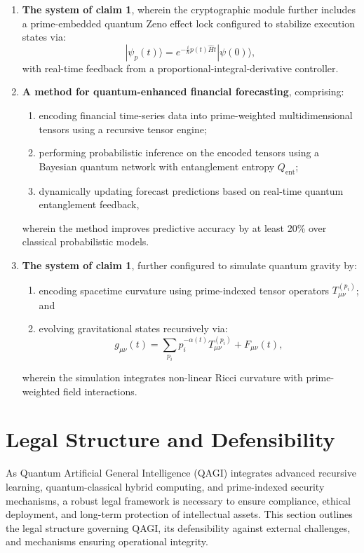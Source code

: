 \documentclass{article}
\theoremstyle{plain}
\theoremstyle{claimstyle}
\begin{document}
\begin{enumerate}
\item \textbf{The system of claim 1}, wherein the cryptographic module further includes a prime-embedded quantum Zeno effect lock configured to stabilize execution states via:
\[
|\psi_p(t)\rangle = e^{-\frac{i}{\hbar} p(t) \hat{H} t} |\psi(0)\rangle,
\]
with real-time feedback from a proportional-integral-derivative controller.

\item \textbf{A method for quantum-enhanced financial forecasting}, comprising:
\begin{enumerate}
    \item encoding financial time-series data into prime-weighted multidimensional tensors using a recursive tensor engine;
    \item performing probabilistic inference on the encoded tensors using a Bayesian quantum network with entanglement entropy \( Q_{\text{ent}} \);
    \item dynamically updating forecast predictions based on real-time quantum entanglement feedback,
\end{enumerate}
wherein the method improves predictive accuracy by at least 20\% over classical probabilistic models.

\item \textbf{The system of claim 1}, further configured to simulate quantum gravity by:
\begin{enumerate}
    \item encoding spacetime curvature using prime-indexed tensor operators \( T_{\mu\nu}^{(p_i)} \); and
    \item evolving gravitational states recursively via:
    \[
    g_{\mu\nu}(t) = \sum_{p_i} p_i^{-\alpha(t)} T_{\mu\nu}^{(p_i)} + F_{\mu\nu}(t),
    \]
\end{enumerate}
wherein the simulation integrates non-linear Ricci curvature with prime-weighted field interactions.

\end{enumerate}

\section{Legal Structure and Defensibility}

As Quantum Artificial General Intelligence (QAGI) integrates advanced recursive learning, quantum-classical hybrid computing, and prime-indexed security mechanisms, a robust legal framework is necessary to ensure compliance, ethical deployment, and long-term protection of intellectual assets. This section outlines the legal structure governing QAGI, its defensibility against external challenges, and mechanisms ensuring operational integrity.
\end{document}
